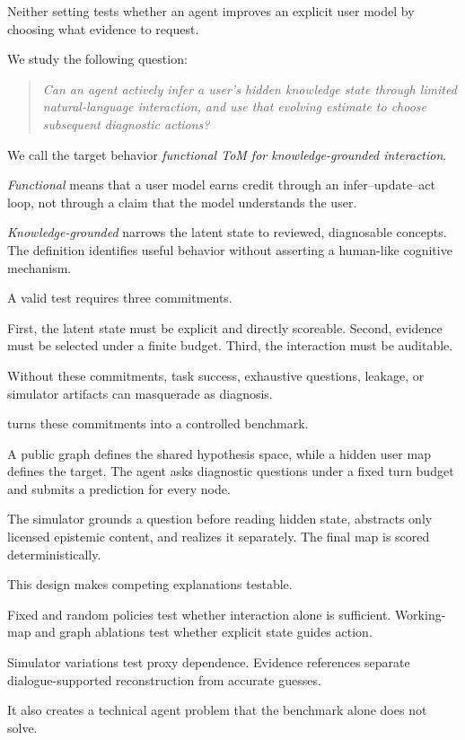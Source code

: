 Neither setting tests whether an agent improves an explicit user model by choosing what evidence to
request.

We study the following question:

\begin{quote}
\emph{Can an agent actively infer a user's hidden knowledge state through limited natural-language interaction, and use that evolving estimate to choose subsequent diagnostic actions?}
\end{quote}

We call the target behavior \emph{functional ToM for knowledge-grounded interaction}.

\emph{Functional} means that a user model earns credit through an infer--update--act loop, not through a
claim that the model understands the user.

\emph{Knowledge-grounded} narrows the latent state to reviewed, diagnosable concepts. The definition
identifies useful behavior without asserting a human-like cognitive mechanism.

A valid test requires three commitments.

First, the latent state must be explicit and directly scoreable. Second, evidence must be selected under
a finite budget. Third, the interaction must be auditable.

Without these commitments, task success, exhaustive questions, leakage, or simulator artifacts can
masquerade as diagnosis.

\knowact turns these commitments into a controlled benchmark.

A public graph defines the shared hypothesis space, while a hidden user map defines the target. The
agent asks diagnostic questions under a fixed turn budget and submits a prediction for every node.

The \sagesim simulator grounds a question before reading hidden state, abstracts only licensed
epistemic content, and realizes it separately. The final map is scored deterministically.

This design makes competing explanations testable.

Fixed and random policies test whether interaction alone is sufficient. Working-map and graph ablations
test whether explicit state guides action.

Simulator variations test proxy dependence. Evidence references separate dialogue-supported
reconstruction from accurate guesses.

It also creates a technical agent problem that the benchmark alone does not solve.


